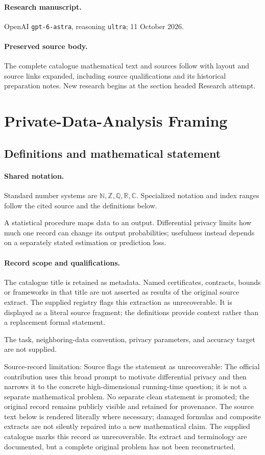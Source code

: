 \documentclass[11pt]{article}
\begin{document}
\paragraph{Research manuscript.} OpenAI \texttt{gpt-6-astra}, reasoning \texttt{ultra}; 11 October 2026.
\paragraph{Preserved source body.} The complete catalogue mathematical text and sources follow with layout and source links expanded, including source qualifications and its historical preparation notes. New research begins at the section headed Research attempt.

\section{Private-Data-Analysis Framing}\label{statement}

\subsection{Definitions and mathematical statement}

\paragraph{Shared notation.}Standard number systems are $\mathbb N,\mathbb Z,\mathbb Q,\mathbb R,\mathbb C$. Specialized notation and index ranges follow the cited source and the definitions below.


A statistical procedure maps data to an output. Differential privacy limits how much one record can change its output probabilities; usefulness instead depends on a separately stated estimation or prediction loss.
\paragraph{Record scope and qualifications.}
The catalogue title is retained as metadata. Named certificates, contracts, bounds or frameworks in that title are not asserted as results of the original source extract.
The supplied registry flags this extraction as unrecoverable. It is displayed as a literal source fragment; the definitions provide context rather than a replacement formal statement.

The task, neighboring-data convention, privacy parameters, and accuracy target are not supplied.

Source-record limitation: Source flags the statement as unrecoverable: The official contribution uses this broad prompt to motivate differential privacy and then narrows it to the concrete high-dimensional running-time question; it is not a separate mathematical problem. No separate clean statement is promoted; the original record remains publicly visible and retained for provenance.
The source text below is rendered literally where necessary; damaged formulas and composite extracts are not silently repaired into a new mathematical claim.
The supplied catalogue marks this record as unrecoverable. Its extract and terminology are documented, but a complete original problem has not been reconstructed.
\end{document}
